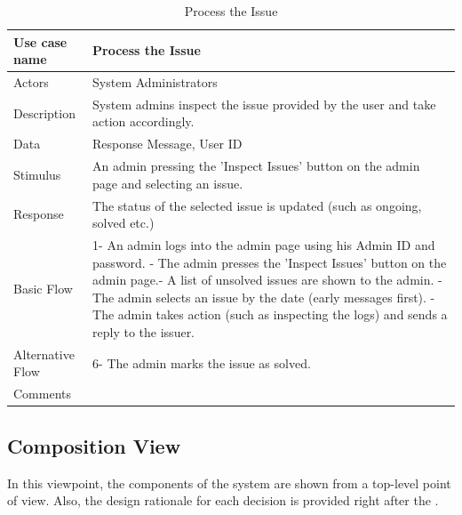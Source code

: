 \documentclass[11pt]{article}
\begin{document}
        \begin{table}[H]
            \begin{centering}
            \begin{tabular}{|p{2.5cm}|p{12cm}|}
            \hline
            Use case name & Process the Issue  \\ \hline
            Actors        & System Administrators \\ \hline
            Description   & System admins inspect the issue provided by the user and take action accordingly. \\ \hline
            Data          & Response Message, User ID \\ \hline
            Stimulus      & An admin pressing the 'Inspect Issues' button on the admin page and selecting an issue.\\ \hline
            Response      & The status of the selected issue is updated (such as ongoing, solved etc.) \\ \hline
            Basic Flow    & 
            1- An admin logs into the admin page using his Admin ID and password. \newline
            2- The admin presses the 'Inspect Issues' button on the admin page.\newline
            3- A list of unsolved issues are shown to the admin.  \newline
            4- The admin selects an issue by the date (early messages first). \newline
            5- The admin takes action (such as inspecting the logs) and sends a reply to the issuer. \\ \hline
            Alternative
                Flow      & 
            6- The admin marks the issue as solved.\\ \hline
            Comments      & \\ \hline
        \end{tabular}
        \caption{Process the Issue}
        \label{tab_14}
        \end{centering}
        \end{table}    



    \subsection{Composition View}
        In this viewpoint, the components of the system are shown from a top-level point of view. Also, the design rationale for 
        each decision is provided right after the . 
\end{document}
